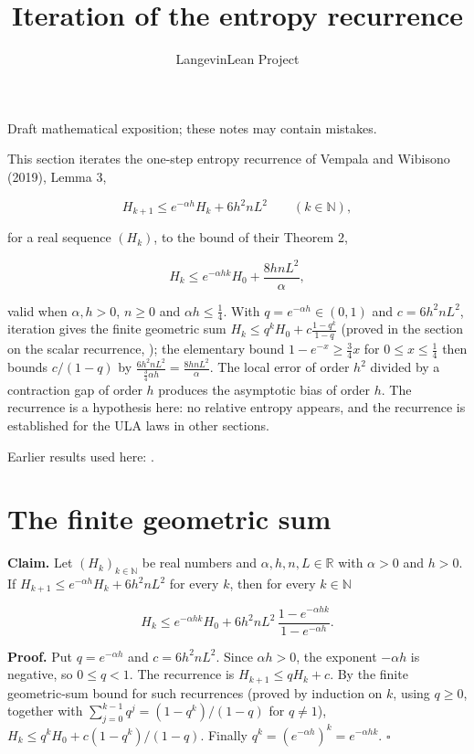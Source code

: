 \documentclass[11pt,a4paper]{article}
\title{\texorpdfstring{Iteration of the entropy recurrence}{Iteration of the entropy recurrence}}
\author{LangevinLean Project}
\date{}
\begin{document}
\maketitle
Draft mathematical exposition; these notes may contain mistakes.


This section iterates the one-step entropy recurrence of Vempala and Wibisono (2019), Lemma 3,


\[H_{k+1}\le e^{-\alpha h}H_k+6h^2nL^2\qquad(k\in\mathbb N),\]


for a real sequence \((H_k)\), to the bound of their Theorem 2,


\[H_k\le e^{-\alpha hk}H_0+\frac{8hnL^2}{\alpha},\]


valid when \(\alpha,h>0\), \(n\ge0\) and \(\alpha h\le\frac14\). With \(q=e^{-\alpha h}\in(0,1)\) and \(c=6h^2nL^2\), iteration gives the finite geometric sum \(H_k\le q^kH_0+c\frac{1-q^k}{1-q}\) (proved in the section on the scalar recurrence, \cite[Section~3.15.2]{LangevinLean2026ULASC}); the elementary bound \(1-e^{-x}\ge\frac34x\) for \(0\le x\le\frac14\) then bounds \(c/(1-q)\) by \(\frac{6h^2nL^2}{\frac34\alpha h}=\frac{8hnL^2}{\alpha}\). The local error of order \(h^2\) divided by a contraction gap of order \(h\) produces the asymptotic bias of order \(h\). The recurrence is a hypothesis here: no relative entropy appears, and the recurrence is established for the ULA laws in other sections.



Earlier results used here: \cite[Section~3.15]{LangevinLean2026ULASC}.

\section{\texorpdfstring{The finite geometric sum}{The finite geometric sum}}


\textbf{Claim.} Let \((H_k)_{k\in\mathbb N}\) be real numbers and \(\alpha,h,n,L\in\mathbb R\) with \(\alpha>0\) and \(h>0\). If \(H_{k+1}\le e^{-\alpha h}H_k+6h^2nL^2\) for every \(k\), then for every \(k\in\mathbb N\)


\[H_k\le e^{-\alpha hk}H_0+6h^2nL^2\,\frac{1-e^{-\alpha hk}}{1-e^{-\alpha h}}.\]


\textbf{Proof.} Put \(q=e^{-\alpha h}\) and \(c=6h^2nL^2\). Since \(\alpha h>0\), the exponent \(-\alpha h\) is negative, so \(0\le q<1\). The recurrence is \(H_{k+1}\le qH_k+c\). By the finite geometric-sum bound for such recurrences (proved by induction on \(k\), using \(q\ge0\), together with \(\sum_{j=0}^{k-1}q^j=(1-q^k)/(1-q)\) for \(q\neq1\)), \(H_k\le q^kH_0+c(1-q^k)/(1-q)\). Finally \(q^k=(e^{-\alpha h})^k=e^{-\alpha hk}\). \(\square\)
\end{document}

